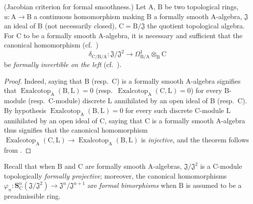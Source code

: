 \begin{theorem}[22.6.1]
\label{0.22.6.1}
\textnormal{(Jacobian criterion for formal smoothness.)}
Let $\mathrm{A}$, $\mathrm{B}$ be two topological rings, $u:\mathrm{A}\to\mathrm{B}$ a continuous homomorphism making $\mathrm{B}$ a formally smooth $\mathrm{A}$-algebra, $\mathfrak{J}$ an ideal of $\mathrm{B}$ (not necessarily closed), $\mathrm{C}=\mathrm{B}/\mathfrak{J}$ the quotient topological algebra.
For $\mathrm{C}$ to be a formally smooth $\mathrm{A}$-algebra, it is necessary and sufficient that the canonical homomorphism (cf.~)
\[
\label{0.22.6.1.1}
  \delta_{\mathrm{C}/\mathrm{B}/\mathrm{A}}:\mathfrak{J}/\mathfrak{J}^2\to\Omega^1_{\mathrm{B}/\mathrm{A}}\otimes_\mathrm{B}\mathrm{C}
  \tag{22.6.1.1}
\]
be \emph{formally invertible on the left} (cf.~).
\end{theorem}

\begin{proof}
Indeed, saying that $\mathrm{B}$ (resp.~$\mathrm{C}$) is a formally smooth $\mathrm{A}$-algebra signifies  that $\operatorname{Exalcotop}_\mathrm{A}(\mathrm{B},\mathrm{L})=0$ (resp.~$\operatorname{Exalcotop}_\mathrm{A}(\mathrm{C},\mathrm{L})=0$) for every $\mathrm{B}$-module (resp.~$\mathrm{C}$-module) discrete $\mathrm{L}$ annihilated by an open ideal of $\mathrm{B}$ (resp.~$\mathrm{C}$).
By hypothesis $\operatorname{Exalcotop}_\mathrm{A}(\mathrm{B},\mathrm{L})=0$ for every such discrete $\mathrm{C}$-module $\mathrm{L}$ annihilated by an open ideal of $\mathrm{C}$, saying that $\mathrm{C}$ is a formally smooth $\mathrm{A}$-algebra thus signifies that the canonical homomorphism $\operatorname{Exalcotop}_\mathrm{A}(\mathrm{C},\mathrm{L})\to\operatorname{Exalcotop}_\mathrm{A}(\mathrm{B},\mathrm{L})$ is \emph{injective}, and the theorem follows from .
\end{proof}

Recall  that when $\mathrm{B}$ and $\mathrm{C}$ are formally smooth $\mathrm{A}$-algebras, $\mathfrak{J}/\mathfrak{J}^2$ is a $\mathrm{C}$-module topologically \emph{formally projective}; moreover, the canonical homomorphisms $\varphi_n:\mathbf{S}^n_\mathrm{C}(\mathfrak{J}/\mathfrak{J}^2)\to\mathfrak{J}^n/\mathfrak{J}^{n+1}$ are \emph{formal bimorphisms} when $\mathrm{B}$ is assumed to be a preadmissible ring.

